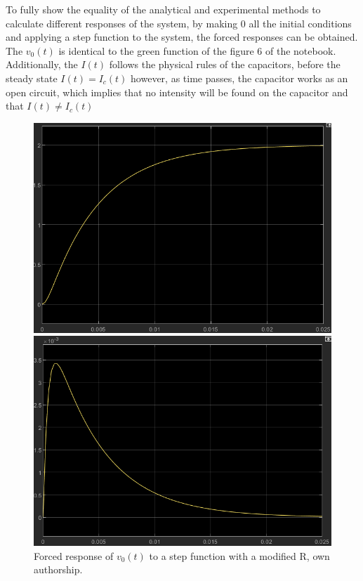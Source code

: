 \documentclass[a4paper,12pt]{article}
\begin{document}
\vspace{0.5cm}

To fully show the equality of the analytical and experimental methods to calculate different responses of the system, by making 0 all the initial conditions and applying a step function to the system, the forced responses can be obtained. The $v_0(t)$ is identical to the green function of the figure 6 of the notebook. Additionally, the $I(t)$ follows the physical rules of the capacitors, before the steady state $I(t) = I_c(t)$ however, as time passes, the capacitor works as an open circuit, which implies that no intensity will be found on the capacitor and that $I(t) \neq I_c(t)$

\vspace{0.5cm}

\begin{figure}[H]
    \centering
    \begin{minipage}[b]{0.45\linewidth}
        \centering
        \includegraphics[width=\linewidth]{scopevstep0.png}
        \caption{Forced response of $v_0(t)$ to a step function with a modified R, own authorship.}
        \label{fig:scopevstep0}
    \end{minipage}
    \hspace{0.05\linewidth} %
    \begin{minipage}[b]{0.45\linewidth}
        \centering
        \includegraphics[width=\linewidth]{scopeistep0.png}

\end{minipage}
\end{figure}
\end{document}
